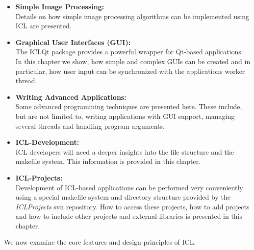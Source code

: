 \begin{itemize}
\item \textbf{Simple Image Processing:}\\ Details on how simple image processing algorithms can be implemented using ICL are presented.
\item \textbf{Graphical User Interfaces (GUI):}\\ The ICLQt package provides a powerful wrapper for Qt-based applications. In this chapter we show, how simple and complex GUIs can be created and in particular, how user input can be synchronized with the applications worker thread.
\item \textbf{Writing Advanced Applications:}\\ Some advanced programming techniques are presented here. These include, but are not limited to, writing applications with GUI support, managing several threads and handling program arguments.
\item \textbf{ICL-Development:}\\ICL developers will need a deeper insights into the file structure and the makefile system. This information is provided in this chapter.
\item \textbf{ICL-Projects:}\\Development of ICL-based applications can be performed very conveniently using a special makefile system and directory structure provided by the \emph{ICLProjects} svn repository. How to access these projects, how to add projects and how to include other projects and external libraries is presented in this chapter.
\end{itemize} 

We now examine the core features and design principles of ICL.



